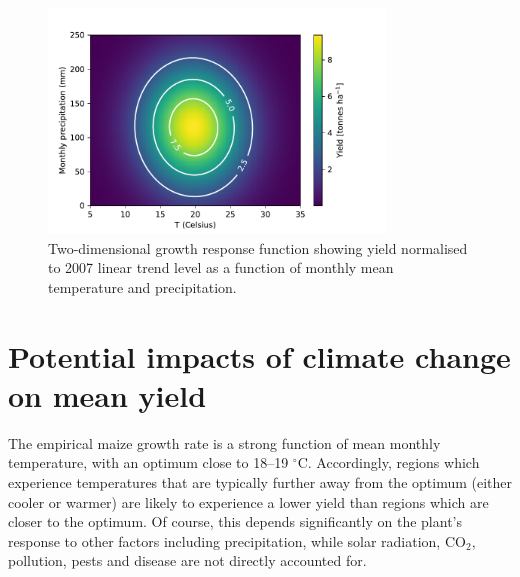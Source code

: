 \documentclass[12pt]{iopart}
\begin{document}

\begin{figure}
\centering
\includegraphics[width=0.8\textwidth]{./figures/2d_2_contour}
\caption{\label{fig:response_function} Two-dimensional growth response function showing yield normalised to 2007 linear trend level as a function of monthly mean temperature and precipitation.}
\end{figure}

\section{Potential impacts of climate change on mean yield}
\label{sec:impacts}
The empirical maize growth rate is a strong function of mean monthly temperature, with an optimum close to 18--19 $^\circ$C. Accordingly, regions which experience temperatures that are typically further away from the optimum (either cooler or warmer) are likely to experience a lower yield than regions which are closer to the optimum. Of course, this depends significantly on the plant's response to other factors including precipitation, while solar radiation, CO$_{2}$, pollution, pests and disease are not directly accounted for. 
\end{document}
